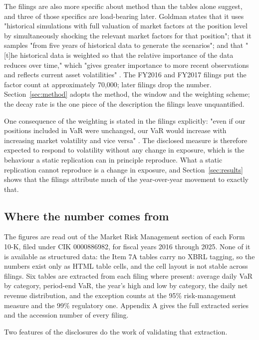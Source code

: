The filings are also more specific about method than the tables alone suggest,
and three of those specifics are load-bearing later. Goldman states that it
uses "historical simulations with full valuation of market factors at the
position level by simultaneously shocking the relevant market factors for that
position"; that it samples "from five years of historical data to generate the
scenarios"; and that "[t]he historical data is weighted so that the relative
importance of the data reduces over time," which "gives greater importance to
more recent observations and reflects current asset volatilities"
\citep{gs10k}. The FY2016 and FY2017 filings put the factor count at
approximately 70,000; later filings drop the number. Section~\ref{sec:method}
adopts the method, the window and the weighting scheme; the decay rate is the
one piece of the description the filings leave unquantified.

One consequence of the weighting is stated in the filings explicitly: "even if
our positions included in VaR were unchanged, our VaR would increase with
increasing market volatility and vice versa" \citep{gs10k}. The disclosed
measure is therefore expected to respond to volatility without any change in
exposure, which is the behaviour a static replication can in principle
reproduce. What a static replication cannot reproduce is a change in exposure,
and Section~\ref{sec:results} shows that the filings attribute much of the
year-over-year movement to exactly that.

\subsection{Where the number comes from}

The figures are read out of the Market Risk Management section of each Form
10-K, filed under CIK 0000886982, for fiscal years 2016 through 2025. None of
it is available as structured data: the Item 7A tables carry no XBRL tagging,
so the numbers exist only as HTML table cells, and the cell layout is not
stable across filings. Six tables are extracted from each filing where
present: average daily VaR by category, period-end VaR, the year's high and low
by category, the daily net revenue distribution, and the exception counts at
the 95\% risk-management measure and the 99\% regulatory one. Appendix A gives
the full extracted series and the accession number of every filing.

Two features of the disclosures do the work of validating that extraction.

